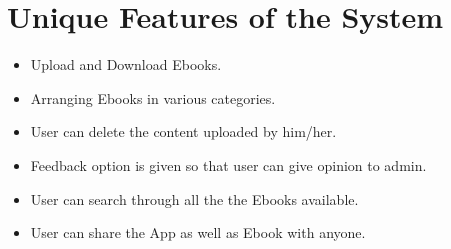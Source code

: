  
\section{Unique Features of the System}
\begin{itemize}

\item Upload and Download Ebooks.
\item Arranging Ebooks in various categories.
\item User can delete the content uploaded by him/her.
\item Feedback option is given so that user can give opinion to admin.
\item User can search through all the the Ebooks available.
\item User can share the App as well as Ebook with anyone. 
\end{itemize}


